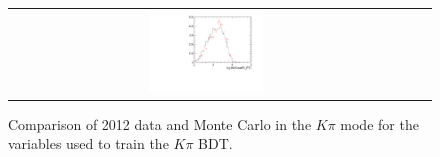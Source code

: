 \begin{figure}
\begin{tabular}{ccc}
\includegraphics[width=0.3\textwidth]{ANA_resources/Plots/Monte_carlo/data_vs_MC/Kpi/log10(KstarPi_PT)_2012.pdf} & & \\
\end{tabular}
\caption{Comparison of 2012 data and Monte Carlo in the $K\pi$ mode for the variables used to train the $K\pi$ BDT.}
\label{fig:data_vs_MC_Kpi_2012}
\end{figure}
